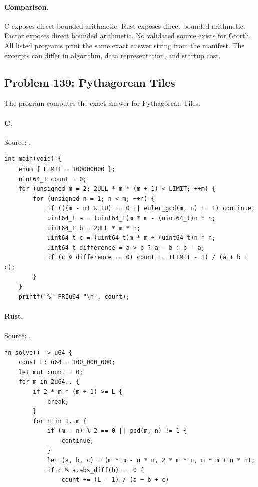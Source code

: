 \paragraph{Comparison.}
C exposes direct bounded arithmetic. Rust exposes direct bounded arithmetic. Factor exposes direct bounded arithmetic.
No validated source exists for Gforth.
All listed programs print the same exact answer string from the manifest. The excerpts can differ in algorithm, data representation, and startup cost.

\subsection{Problem 139: Pythagorean Tiles}
\label{walkthrough:p139}
The program computes the exact answer for Pythagorean Tiles.

\paragraph{C.} Source: .
\begin{lstlisting}
int main(void) {
    enum { LIMIT = 100000000 };
    uint64_t count = 0;
    for (unsigned m = 2; 2ULL * m * (m + 1) < LIMIT; ++m) {
        for (unsigned n = 1; n < m; ++n) {
            if (((m - n) & 1U) == 0 || euler_gcd(m, n) != 1) continue;
            uint64_t a = (uint64_t)m * m - (uint64_t)n * n;
            uint64_t b = 2ULL * m * n;
            uint64_t c = (uint64_t)m * m + (uint64_t)n * n;
            uint64_t difference = a > b ? a - b : b - a;
            if (c % difference == 0) count += (LIMIT - 1) / (a + b + c);
        }
    }
    printf("%" PRIu64 "\n", count);
\end{lstlisting}

\paragraph{Rust.} Source: .
\begin{lstlisting}
fn solve() -> u64 {
    const L: u64 = 100_000_000;
    let mut count = 0;
    for m in 2u64.. {
        if 2 * m * (m + 1) >= L {
            break;
        }
        for n in 1..m {
            if (m - n) % 2 == 0 || gcd(m, n) != 1 {
                continue;
            }
            let (a, b, c) = (m * m - n * n, 2 * m * n, m * m + n * n);
            if c % a.abs_diff(b) == 0 {
                count += (L - 1) / (a + b + c)
\end{lstlisting}

